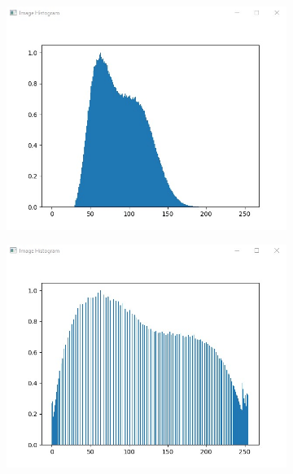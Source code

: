 \documentclass[12pt, twocolumn]{report}
\begin{document}
\begin{figure}[htbp]
\begin{subfigure}{0.45\textwidth}
        \includegraphics[width=1\textwidth]{Figures/Software initial histogram.jpg}
    \end{subfigure}
    \begin{subfigure}{0.45\textwidth}
        \centering
        \includegraphics[width=1\textwidth]{Figures/Software final histogram.jpg}
    \end{subfigure}
    \begin{subfigure}{0.45\textwidth}
        \centering

\end{subfigure}
\end{figure}
\end{document}
